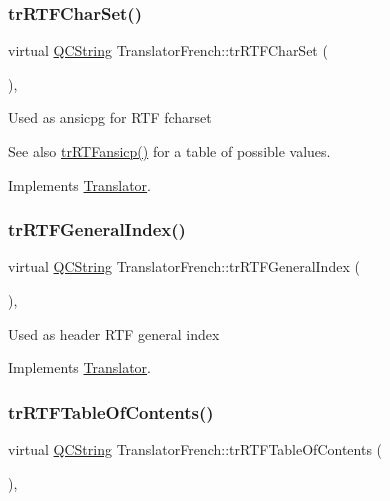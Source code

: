 \subsubsection{\texorpdfstring{trRTFCharSet()}{trRTFCharSet()}}
{\footnotesize\ttfamily virtual \mbox{\hyperlink{class_q_c_string}{Q\+C\+String}} Translator\+French\+::tr\+R\+T\+F\+Char\+Set (\begin{DoxyParamCaption}{ }\end{DoxyParamCaption})\hspace{0.3cm}{\ttfamily [inline]}, {\ttfamily [virtual]}}

Used as ansicpg for R\+TF fcharset \begin{DoxySeeAlso}{See also}
\mbox{\hyperlink{class_translator_french_abfc38820bc57b6179750e68567150441}{tr\+R\+T\+Fansicp()}} for a table of possible values. 
\end{DoxySeeAlso}


Implements \mbox{\hyperlink{class_translator_afad391f3cbfb5ce6332b7239f8e2049a}{Translator}}.

\mbox{\label{class_translator_french_a6f4a82e8b34a8f8c520d92ef0e04e8d1}} 
\subsubsection{\texorpdfstring{trRTFGeneralIndex()}{trRTFGeneralIndex()}}
{\footnotesize\ttfamily virtual \mbox{\hyperlink{class_q_c_string}{Q\+C\+String}} Translator\+French\+::tr\+R\+T\+F\+General\+Index (\begin{DoxyParamCaption}{ }\end{DoxyParamCaption})\hspace{0.3cm}{\ttfamily [inline]}, {\ttfamily [virtual]}}

Used as header R\+TF general index 

Implements \mbox{\hyperlink{class_translator}{Translator}}.

\mbox{\label{class_translator_french_ae8db0227da1bba8c561270bd562273d4}} 
\subsubsection{\texorpdfstring{trRTFTableOfContents()}{trRTFTableOfContents()}}
{\footnotesize\ttfamily virtual \mbox{\hyperlink{class_q_c_string}{Q\+C\+String}} Translator\+French\+::tr\+R\+T\+F\+Table\+Of\+Contents (\begin{DoxyParamCaption}{ }\end{DoxyParamCaption})\hspace{0.3cm}{\ttfamily [inline]}, {\ttfamily [virtual]}}

